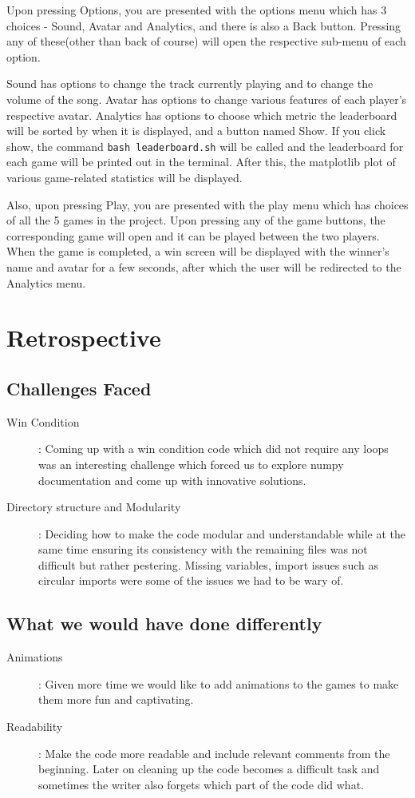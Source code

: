 \documentclass[12pt, letter]{article}
\begin{document}
Upon pressing Options, you are presented with the options menu which has 3 choices - Sound, Avatar and Analytics, and there is also a Back button. Pressing any of these(other than back of course) will open the respective sub-menu of each option. 

Sound has options to change the track currently playing and to change the volume of the song. Avatar has options to change various features of each player's respective avatar. Analytics has options to choose which metric the leaderboard will be sorted by when it is displayed, and a button named Show. If you click show, the command \texttt{bash leaderboard.sh} will be called and the leaderboard for each game will be printed out in the terminal. After this, the matplotlib plot of various game-related statistics will be displayed.

Also, upon pressing Play, you are presented with the play menu which has choices of all the 5 games in the project. Upon pressing any of the game buttons, the corresponding game will open and it can be played between the two players. When the game is completed, a win screen will be displayed with the winner's name and avatar for a few seconds, after which the user will be redirected to the Analytics menu.

\section{Retrospective}
\subsection{Challenges Faced}
\begin{description}
\item[Win Condition]: Coming up with a win condition code which did not require any loops was an interesting challenge which forced us to explore numpy documentation and come up with innovative solutions.
\item[Directory structure and Modularity]: Deciding how to make the code modular and understandable while at the same time ensuring its consistency with the remaining files was not difficult but rather pestering. Missing variables, import issues such as circular imports were some of the issues we had to be wary of.
\end{description}
\subsection{What we would have done differently}
\begin{description}
\item[Animations]: Given more time we would like to add animations to the games to make them more fun and captivating.
\item[Readability]: Make the code more readable and include relevant comments from the beginning. Later on cleaning up the code becomes a difficult task and sometimes the writer also forgets which part of the code did what.
\end{description}



\end{document}

